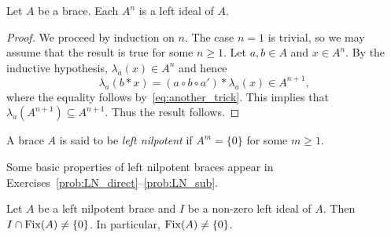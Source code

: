 \begin{proposition}
    \label{pro:left_series}
    Let $A$ be a brace. Each $A^{n}$ is a left ideal of $A$.
\end{proposition}

\begin{proof}
    We proceed by induction on $n$. The case $n=1$ is trivial, so we may assume
    that the result is true for some $n\geq1$. Let $a,b\in A$ and $x\in A^n$.
    By the inductive hypothesis, $\lambda_a(x)\in A^n$ and hence
    \[
        \lambda_a(b*x)=(a\circ b\circ a')*\lambda_a(x)\in A^{n+1},
    \]
where the equality follows by~\eqref{eq:another_trick}. This implies
that $\lambda_a(A^{n+1})\subseteq A^{n+1}$. Thus the result
follows.
\end{proof}

\begin{definition}
    A brace $A$ is said to be \emph{left nilpotent} if $A^{m}=\{0\}$ for some
    $m\geq1$.
\end{definition}

Some basic properties of left nilpotent braces appear in Exercises~\ref{prob:LN_direct}--\ref{prob:LN_sub}. 

    
\begin{proposition}
    \label{pro:IcapFix}
    Let $A$ be a left nilpotent brace and $I$ be a non-zero left ideal of
    $A$. Then $I\cap\operatorname{Fix}(A)\ne\{0\}$. In particular, $\operatorname{Fix}(A)\ne\{0\}$. 
\end{proposition}

